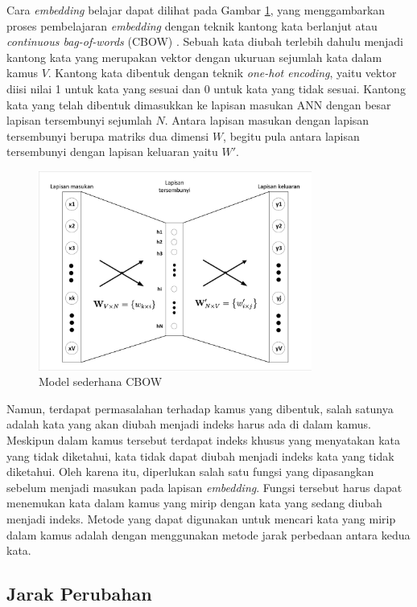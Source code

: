 Cara \textit{embedding} belajar dapat dilihat pada Gambar \ref{fig:cbow}, yang menggambarkan proses pembelajaran \textit{embedding} dengan teknik kantong kata berlanjut atau \textit{continuous bag-of-words} (CBOW) \parencite{Rong2014word2vecPL}. Sebuah kata diubah terlebih dahulu menjadi kantong kata yang merupakan vektor dengan ukuruan sejumlah kata dalam kamus $V$. Kantong kata dibentuk dengan teknik \textit{one-hot encoding}, yaitu vektor diisi nilai 1 untuk kata yang sesuai dan 0 untuk kata yang tidak sesuai. Kantong kata yang telah dibentuk dimasukkan ke lapisan masukan ANN dengan besar lapisan tersembunyi sejumlah $N$. Antara lapisan masukan dengan lapisan tersembunyi berupa matriks dua dimensi $W$, begitu pula antara lapisan tersembunyi dengan lapisan keluaran yaitu $W'$.
\begin{figure}[ht]
	\centering
	\includegraphics[width=0.8\textwidth, trim=2 2 2 2, clip]{resources/2/cbow.pdf}
	\caption{Model sederhana CBOW \parencite{Rong2014word2vecPL}}
	\label{fig:cbow}
\end{figure}

Namun, terdapat permasalahan terhadap kamus yang dibentuk, salah satunya adalah kata yang akan diubah menjadi indeks harus ada di dalam kamus. Meskipun dalam kamus tersebut terdapat indeks khusus yang menyatakan kata yang tidak diketahui, kata tidak dapat diubah menjadi indeks kata yang tidak diketahui. Oleh karena itu, diperlukan salah satu fungsi yang dipasangkan sebelum menjadi masukan pada lapisan \textit{embedding}. Fungsi tersebut harus dapat menemukan kata dalam kamus yang mirip dengan kata yang sedang diubah menjadi indeks. Metode yang dapat digunakan untuk mencari kata yang mirip dalam kamus adalah dengan menggunakan metode jarak perbedaan antara kedua kata.

\subsection{Jarak Perubahan}

